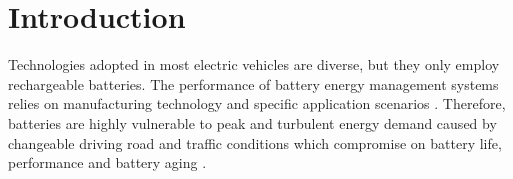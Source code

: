 \documentclass[energies,article,submit,moreauthors,pdftex,10pt,a4paper]{Definitions/mdpi}
\begin{document}


\section{Introduction}
Technologies adopted in most electric vehicles are diverse, but they only employ rechargeable batteries. The performance of battery energy management systems relies on manufacturing technology and specific application scenarios \cite{IEEEhowto:intro1, IEEEhowto:intro2}. Therefore, batteries are highly vulnerable to peak and turbulent energy demand caused by changeable driving road and traffic conditions which compromise on battery life, performance and battery aging	 \cite{IEEEhowto:intro3}.
\end{document}
